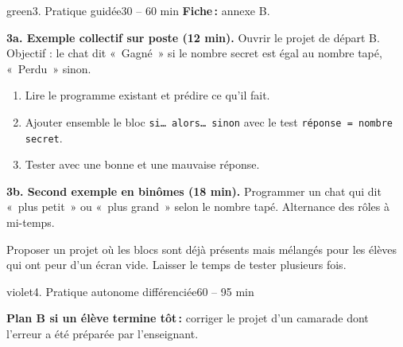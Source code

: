 \documentclass[11pt,a4paper]{article}
\begin{document}
\begin{etape}{green}{3. Pratique guidée}{30 -- 60 min}
\textbf{Fiche\,:} annexe B.

\textbf{3a. Exemple collectif sur poste (12 min).} Ouvrir le projet de départ B. Objectif : le chat dit «~Gagné~» si le nombre secret est égal au nombre tapé, «~Perdu~» sinon.
\begin{enumerate}
 \item Lire le programme existant et prédire ce qu'il fait.
 \item Ajouter ensemble le bloc \texttt{si\ldots{} alors\ldots{} sinon} avec le test \texttt{réponse = nombre secret}.
 \item Tester avec une bonne et une mauvaise réponse.
\end{enumerate}

\textbf{3b. Second exemple en binômes (18 min).} Programmer un chat qui dit «~plus petit~» ou «~plus grand~» selon le nombre tapé. Alternance des rôles à mi-temps.


\begin{astuce}
Proposer un projet où les blocs sont déjà présents mais mélangés pour les élèves qui ont peur d'un écran vide. Laisser le temps de tester plusieurs fois.
\end{astuce}
\end{etape}

\begin{etape}{violet}{4. Pratique autonome différenciée}{60 -- 95 min}

\medskip
\textbf{Plan B si un élève termine tôt\,:} corriger le projet d'un camarade dont l'erreur a été préparée par l'enseignant.
\end{etape}
\end{document}
